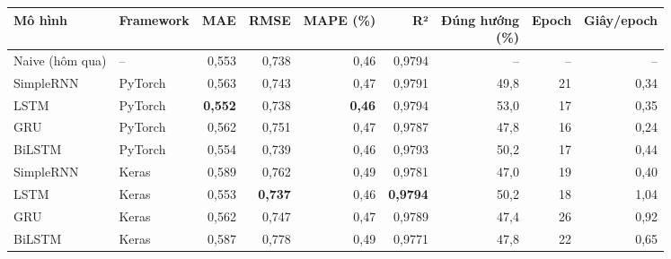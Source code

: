 \begin{tabular}{llrrrrrrr}
\toprule
Mô hình & Framework & MAE & RMSE & MAPE (\%) & R² & \makecell[r]{Đúng hướng\\(\%)} & Epoch & Giây/epoch \\
\midrule
Naive (hôm qua) & -- & 0{,}553 & 0{,}738 & 0{,}46 & 0{,}9794 & -- & -- & -- \\
\midrule
SimpleRNN & PyTorch & 0{,}563 & 0{,}743 & 0{,}47 & 0{,}9791 & 49{,}8 & 21 & 0{,}34 \\
LSTM & PyTorch & \textbf{0{,}552} & 0{,}738 & \textbf{0{,}46} & 0{,}9794 & 53{,}0 & 17 & 0{,}35 \\
GRU & PyTorch & 0{,}562 & 0{,}751 & 0{,}47 & 0{,}9787 & 47{,}8 & 16 & 0{,}24 \\
BiLSTM & PyTorch & 0{,}554 & 0{,}739 & 0{,}46 & 0{,}9793 & 50{,}2 & 17 & 0{,}44 \\
\midrule
SimpleRNN & Keras & 0{,}589 & 0{,}762 & 0{,}49 & 0{,}9781 & 47{,}0 & 19 & 0{,}40 \\
LSTM & Keras & 0{,}553 & \textbf{0{,}737} & 0{,}46 & \textbf{0{,}9794} & 50{,}2 & 18 & 1{,}04 \\
GRU & Keras & 0{,}562 & 0{,}747 & 0{,}47 & 0{,}9789 & 47{,}4 & 26 & 0{,}92 \\
BiLSTM & Keras & 0{,}587 & 0{,}778 & 0{,}49 & 0{,}9771 & 47{,}8 & 22 & 0{,}65 \\
\bottomrule
\end{tabular}
